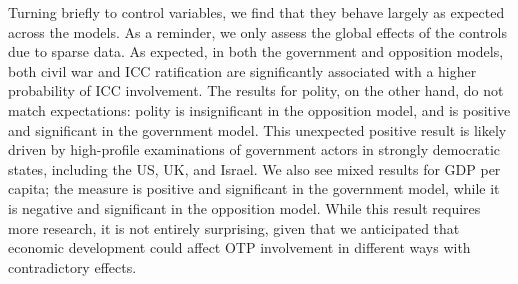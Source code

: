 Turning briefly to control variables, we find that they behave largely as expected across the models. As a reminder, we only assess the global effects of the controls due to sparse data. As expected, in both the government and opposition models, both civil war and ICC ratification are significantly associated with a higher probability of ICC involvement. The results for polity, on the other hand, do not match expectations: polity is insignificant in the opposition model, and is positive and significant in the government model. This unexpected positive result is likely driven by high-profile examinations of government actors in strongly democratic states, including the US, UK, and Israel. We also see mixed results for GDP per capita; the measure is positive and significant in the government model, while it is negative and significant in the opposition model. While this result requires more research, it is not entirely surprising, given that we anticipated that economic development could affect OTP involvement in different ways with contradictory effects.

